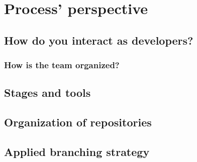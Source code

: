 \section{Process' perspective}
\subsection{How do you interact as developers?}
\subsubsection{How is the team organized?}
\subsection{Stages and tools}
\subsection{Organization of repositories}
\subsection{Applied branching strategy}
